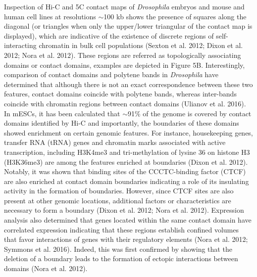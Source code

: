 Inspection of Hi-C and 5C contact maps of \textit{Drosophila} embryos and mouse and human cell lines at resolutions $\sim$100 kb shows the presence of squares along the diagonal (or triangles when only the upper/lower triangular of the contact map is displayed), which are indicative of the existence of discrete regions of self-interacting chromatin in bulk cell populations (Sexton et al. 2012; Dixon et al. 2012; Nora et al. 2012). These regions are referred as topologically associating domains or contact domains, examples are depicted in Figure 5B. Interestingly, comparison of contact domains and polytene bands in \textit{Drosophila} have determined that although there is not an exact correspondence between these two features, contact domains coincide with polytene bands, whereas inter-bands coincide with chromatin regions between contact domains (Ulianov et al. 2016). In mESCs, it has been calculated that $\sim$91\% of the genome is covered by contact domains identified by Hi-C and importantly, the boundaries of these domains showed enrichment on certain genomic features. For instance, housekeeping genes, transfer RNA (tRNA) genes and chromatin marks associated with active transcription, including H3K4me3 and tri-methylation of lysine 36 on histone H3 (H3K36me3) are among the features enriched at boundaries (Dixon et al. 2012). Notably, it was shown that binding sites of the CCCTC-binding factor (CTCF) are also enriched at contact domain boundaries indicating a role of its insulating activity in the formation of boundaries. However, since CTCF sites are also present at other genomic locations, additional factors or characteristics are necessary to form a boundary (Dixon et al. 2012; Nora et al. 2012). Expression analysis also determined that genes located within the same contact domain have correlated expression indicating that these regions establish confined volumes that favor interactions of genes with their regulatory elements (Nora et al. 2012; Symmons et al. 2016). Indeed, this was first confirmed by showing that the deletion of a boundary leads to the formation of ectopic interactions between domains (Nora et al. 2012).\\


